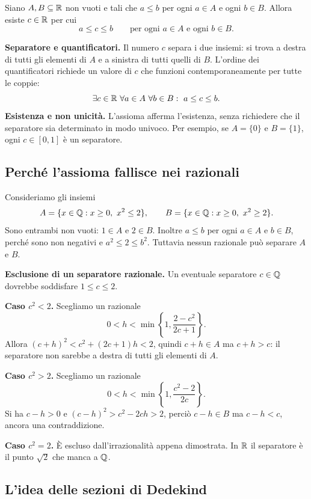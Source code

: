 \begin{assioma}[Dedekind]
\label{ass:dedekind}
Siano $A,B\subseteq\mathbb{R}$ non vuoti e tali che $a\le b$ per ogni $a\in A$ e ogni $b\in B$. Allora esiste $c\in\mathbb{R}$ per cui
\[
  a\le c\le b\qquad\text{per ogni }a\in A\text{ e ogni }b\in B.
\]
\end{assioma}

\textbf{Separatore e quantificatori.} Il numero $c$ separa i due insiemi: si trova a destra di tutti gli elementi di $A$ e a sinistra di tutti quelli di $B$. L'ordine dei quantificatori richiede un valore di $c$ che funzioni contemporaneamente per tutte le coppie:
\[
  \exists c\in\R\ \forall a\in A\ \forall b\in B:\ a\le c\le b.
\]
\textbf{Esistenza e non unicità.} L'assioma afferma l'esistenza, senza richiedere che il separatore sia determinato in modo univoco. Per esempio, se $A=\{0\}$ e $B=\{1\}$, ogni $c\in[0,1]$ è un separatore.

\subsection{Perché l'assioma fallisce nei razionali}

Consideriamo gli insiemi
\[
  A=\{x\in\mathbb{Q}:x\ge0,\ x^2\le2\},\qquad
  B=\{x\in\mathbb{Q}:x\ge0,\ x^2\ge2\}.
\]
Sono entrambi non vuoti: $1\in A$ e $2\in B$. Inoltre $a\le b$ per ogni $a\in A$ e $b\in B$, perché sono non negativi e $a^2\le2\le b^2$. Tuttavia nessun razionale può separare $A$ e $B$.

\textbf{Esclusione di un separatore razionale.} Un eventuale separatore $c\in\mathbb{Q}$ dovrebbe soddisfare $1\le c\le2$.

\textbf{Caso $c^2<2$.} Scegliamo un razionale
\[
  0<h<\min\left\{1,\frac{2-c^2}{2c+1}\right\}.
\]
Allora $(c+h)^2<c^2+(2c+1)h<2$, quindi $c+h\in A$ ma $c+h>c$: il separatore non sarebbe a destra di tutti gli elementi di $A$.

\textbf{Caso $c^2>2$.} Scegliamo un razionale
\[
  0<h<\min\left\{1,\frac{c^2-2}{2c}\right\}.
\]
Si ha $c-h>0$ e $(c-h)^2>c^2-2ch>2$, perciò $c-h\in B$ ma $c-h<c$, ancora una contraddizione.

\textbf{Caso $c^2=2$.} È escluso dall'irrazionalità appena dimostrata. In $\mathbb{R}$ il separatore è il punto $\sqrt2$ che manca a $\mathbb{Q}$.

\subsection{L'idea delle sezioni di Dedekind}

